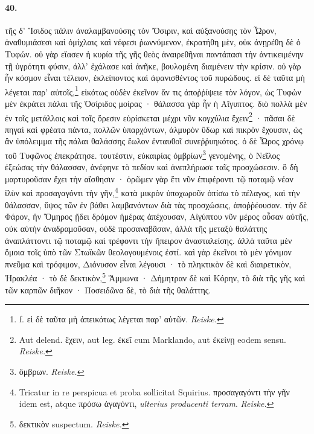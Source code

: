 \documentclass[a4paper, 11pt, oneside, polutonikogreek, german, landscape]{article}
\begin{document}
\paragraph{40.}
τῆς δ' Ἴσιδος πάλιν ἀναλαμβανούσης τὸν Ὄσιριν, καὶ αὐξανούσης τὸν Ὧρον, ἀναθυμιάσεσι καὶ ὁμίχλαις καὶ νέφεσι ῥωννύμενον, ἐκρατήθη μὲν, οὐκ ἀνῃρέθη δὲ ὁ Τυφών. οὐ γὰρ εἴασεν ἡ κυρία τῆς γῆς θεὸς ἀναιρεθῆναι παντάπασι τὴν ἀντικειμένην τῇ ὑγρότητι φύσιν, ἀλλ' ἐχάλασε καὶ ἀνῆκε, βουλομένη διαμένειν τὴν κρίσιν. οὐ γὰρ ἦν κόσμον εἶναι τέλειον, ἐκλείποντος καὶ ἀφανισθέντος τοῦ πυρώδους. εἰ δὲ ταῦτα μὴ λέγεται παρ' αὐτοῖς,\footnote{f. εἰ δὲ ταῦτα μὴ ἀπεικότως λέγεται παρ' αὐτῶν. \emph{Reiske.}} εἰκότως οὐδὲν ἐκεῖνον ἄν τις ἀποῤῥίψειε τὸν λόγον, ὡς Τυφὼν μὲν ἐκράτει πάλαι τῆς Ὀσίριδος μοίρας · θάλασσα γὰρ ἦν ἡ Αἴγυπτος. διὸ πολλὰ μὲν ἐν τοῖς μετάλλοις καὶ τοῖς ὄρεσιν εὑρίσκεται μέχρι νῦν κογχύλια ἔχειν\footnote{Aut delend. ἔχειν, aut leg. ἐκεῖ cum Marklando, aut ἐκείνῃ eodem sensu. \emph{Reiske.}} · πᾶσαι δὲ πηγαὶ καὶ φρέατα πάντα, πολλῶν ὑπαρχόντων, ἁλμυρὸν ὕδωρ καὶ πικρὸν ἔχουσιν, ὡς ἂν ὑπόλειμμα τῆς πάλαι θαλάσσης ἕωλον ἐνταυθοῖ συνεῤῥυηκότος. ὁ δὲ Ὧρος χρόνῳ τοῦ Τυφῶνος ἐπεκράτησε. τουτέστιν, εὐκαιρίας ὀμβρίων\footnote{ὂμβρων. \emph{Reiske.}} γενομένης, ὁ Νεῖλος ἐξεώσας τὴν θάλασσαν, ἀνέφηνε τὸ πεδίον καὶ ἀνεπλήρωσε ταῖς προσχώσεσιν. ὃ δὴ μαρτυροῦσαν ἔχει τὴν αἴσθησιν · ὁρῶμεν γὰρ ἔτι νῦν ἐπιφέροντι τῷ ποταμῷ νέαν ἰλὺν καὶ προσαγαγόντι τὴν γῆν,\footnote{Tricatur in re perspicua et proba sollicitat Squirius. προσαγαγόντι τὴν γῆν idem est, atque πρόσω ἀγαγόντι, \emph{ulterius producenti terram}. \emph{Reiske.}} κατὰ μικρὸν ὑποχωροῦν ὀπίσω τὸ πέλαγος, καὶ τὴν θάλασσαν, ὕψος τῶν ἐν βάθει λαμβανόντων διὰ τὰς προσχώσεις, ἀποῤῥέουσαν. τὴν δὲ Φάρον, ἣν Ὅμηρος ᾔδει δρόμον ἡμέρας ἀπέχουσαν, Αἰγύπτου νῦν μέρος οὖσαν αὐτῆς, οὐκ αὐτὴν ἀναδραμοῦσαν, οὐδὲ προσαναβᾶσαν, ἀλλὰ τῆς μεταξὺ θαλάττης ἀναπλάττοντι τῷ ποταμῷ καὶ τρέφοντι τὴν ἤπειρον ἀνασταλείσης. ἀλλὰ ταῦτα μὲν ὅμοια τοῖς ὑπὸ τῶν Στωϊκῶν θεολογουμένοις ἐστί. καὶ γὰρ ἐκεῖνοι τὸ μὲν γόνιμον πνεῦμα καὶ τρόφιμον, Διόνυσον εἶναι λέγουσι · τὸ πληκτικὸν δὲ καὶ διαιρετικὸν, Ἡρακλέα · τὸ δὲ δεκτικὸν,\footnote{δεκτικὸν suspectum. \emph{Reiske.}} Ἄμμωνα · Δήμητραν δὲ καὶ Κόρην, τὸ διὰ τῆς γῆς καὶ τῶν καρπῶν διῆκον · Ποσειδῶνα δὲ, τὸ διὰ τῆς θαλάττης.
\end{document}

